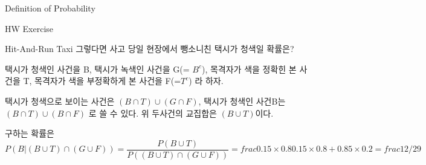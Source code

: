 \begin{edXchapter}{Definition of Probability}
\begin{edXsection}{HW Exercise}
\begin{edXvertical}
\begin{edXproblem}{Hit-And-Run Taxi}
그렇다면 사고 당일 현장에서 뺑소니친 택시가 청색일 확률은?
\end{edXproblem}
\begin{edXsolution}
택시가 청색인 사건을 B, 택시가 녹색인 사건을 G(= $B^c$),
목격자가 색을 정확힌 본 사건을 T, 목격자가 색을 부정확하게 본 사건을 F(=$T^c$)
라 하자.

택시가 청색으로 보이는 사건은 $(B \cap T) \cup (G \cap F)$,
택시가 청색인 사건B는  $(B \cap T) \cup (B \cap F)$ 로 쓸 수 있다.
위 두사건의 교집합은 $(B \cup T)$이다.

구하는 확률은 
\begin{equation}
P(B |{(B \cup T) \cap (G \cup F)}) = \frac{P(B \cup T)}{P((B \cup T) \cap (G \cup F))} = frac{0.15 \times 0.8}{0.15 \times 0.8 + 0.85 \times 0.2} = frac{12/29}
\end{equation}
\end{edXsolution}

\end{edXvertical}
\end{edXsection}
\end{edXchapter}









